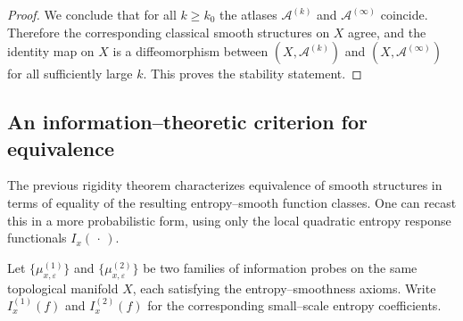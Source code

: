 \documentclass[11pt]{amsart}
\theoremstyle{definition}
\theoremstyle{remark}
\begin{document}
\begin{proof}
We conclude that for all $k\ge k_0$ the atlases $\mathcal{A}^{(k)}$ and
$\mathcal{A}^{(\infty)}$ coincide. Therefore the corresponding classical smooth
structures on $X$ agree, and the identity map on $X$ is a diffeomorphism
between $(X,\mathcal{A}^{(k)})$ and $(X,\mathcal{A}^{(\infty)})$ for all
sufficiently large $k$. This proves the stability statement.
\end{proof}

\subsection{An information--theoretic criterion for equivalence}

The previous rigidity theorem characterizes equivalence of smooth
structures in terms of equality of the resulting entropy--smooth
function classes.  One can recast this in a more probabilistic form,
using only the local quadratic entropy response functionals
$I_x(\,\cdot\,)$.

Let $\{\mu^{(1)}_{x,\varepsilon}\}$ and $\{\mu^{(2)}_{x,\varepsilon}\}$
be two families of information probes on the same topological manifold
$X$, each satisfying the entropy--smoothness axioms.  Write
$I^{(1)}_x(f)$ and $I^{(2)}_x(f)$ for the corresponding small--scale
entropy coefficients.
\end{document}
